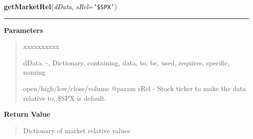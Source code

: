 \hspace{.8\funcindent}\begin{boxedminipage}{\funcwidth}

    \raggedright \textbf{getMarketRel}(\textit{dData}, \textit{sRel}={\tt \texttt{'}\texttt{\$SPX}\texttt{'}})

    \vspace{-1.5ex}

    \rule{\textwidth}{0.5\fboxrule}
\setlength{\parskip}{2ex}
\setlength{\parskip}{1ex}
      \textbf{Parameters}
      \vspace{-1ex}

      \begin{quote}
        \begin{Ventry}{xxxxxxxxxx}

          \item[dData, -, Dictionary, containing, data, to, be, used, requires, specific, naming]

          open/high/low/close/volume @param sRel - Stock ticker to make the
          data relative to, \$SPX is default.

        \end{Ventry}

      \end{quote}

      \textbf{Return Value}
    \vspace{-1ex}

      \begin{quote}
      Dictionary of market relative values

      \end{quote}

    \end{boxedminipage}

    \label{QSTK:qstkfeat:featutil:applyFeatures}

    \vspace{0.5ex}

